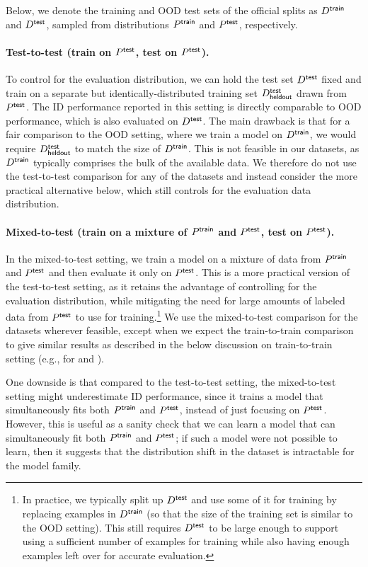 Below, we denote the training and OOD test sets of the official \Wilds splits as $D^\mathsf{train}$ and $D^\mathsf{test}$, sampled from distributions $P^\mathsf{train}$ and $P^\mathsf{test}$, respectively.

\paragraph{Test-to-test (train on $P^\mathsf{test}$, test on $P^\mathsf{test}$).}
To control for the evaluation distribution, we can hold the test set $D^\mathsf{test}$ fixed and train on a separate but identically-distributed training set $D^\mathsf{test}_\mathsf{heldout}$ drawn from $P^\mathsf{test}$.
The ID performance reported in this setting is directly comparable to OOD performance, which is also evaluated on $D^\mathsf{test}$.
The main drawback is that for a fair comparison to the OOD setting, where we train a model on $D^\mathsf{train}$, we would require $D^\mathsf{test}_\mathsf{heldout}$ to match the size of $D^\mathsf{train}$.
This is not feasible in our datasets, as $D^\mathsf{train}$ typically comprises the bulk of the available data.
We therefore do not use the test-to-test comparison for any of the \Wilds datasets and instead consider the more practical alternative below, which still controls for the evaluation data distribution.

\paragraph{Mixed-to-test (train on a mixture of $P^\mathsf{train}$ and $P^\mathsf{test}$, test on $P^\mathsf{test}$).}
In the mixed-to-test setting, we train a model on a mixture of data from $P^\mathsf{train}$ and $P^\mathsf{test}$ and then evaluate it only on $P^\mathsf{test}$.
This is a more practical version of the test-to-test setting, as it retains the advantage of controlling for the evaluation distribution, while mitigating the need for large amounts of labeled data from $P^\mathsf{test}$ to use for training.\footnote{In practice, we typically split up $D^\mathsf{test}$ and use some of it for training by replacing examples in $D^\mathsf{train}$ (so that the size of the training set is similar to the OOD setting). This still requires $D^\mathsf{test}$ to be large enough to support using a sufficient number of examples for training while also having enough examples left over for accurate evaluation.}
We use the mixed-to-test comparison for the \Wilds datasets wherever feasible, except when we expect the train-to-train comparison to give similar results as described in the below discussion on train-to-train setting (e.g., for \iWildCam and \Py).

One downside is that compared to the test-to-test setting, the mixed-to-test setting might underestimate ID performance, since it trains a model that simultaneously fits both $P^\mathsf{train}$ and $P^\mathsf{test}$, instead of just focusing on $P^\mathsf{test}$.
However, this is useful as a sanity check that we can learn a model that can simultaneously fit both $P^\mathsf{train}$ and $P^\mathsf{test}$; if such a model were not possible to learn, then it suggests that the distribution shift in the dataset is intractable for the model family.



